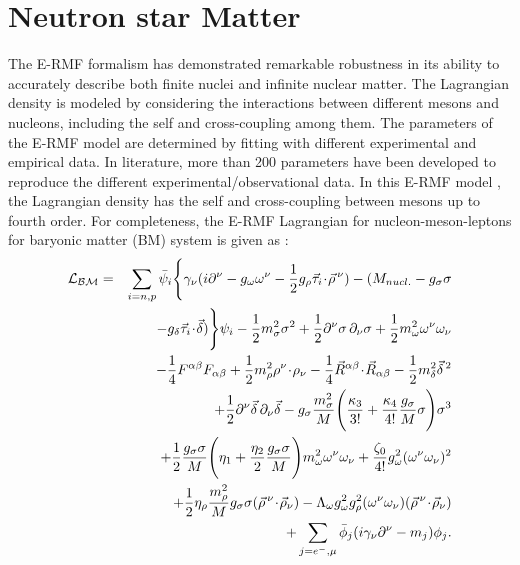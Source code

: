 \section{Neutron star Matter}
\label{sec:2.1}
The E-RMF formalism has demonstrated remarkable robustness in its ability to accurately describe both finite nuclei and infinite nuclear matter. The Lagrangian density is modeled by considering the interactions between different mesons and nucleons, including the self and cross-coupling among them. The parameters of the E-RMF model are determined by fitting with different experimental and empirical data. In literature, more than 200 parameters have been developed to reproduce the different experimental/observational data\cite{PhysRevC.55.540,PhysRevC.63.044303,PhysRevC.74.045806,PhysRevC.70.058801,LALAZISSIS200936,PhysRevC.82.055803,PhysRevC.82.025203,PhysRevC.84.054309,PhysRevC.85.024302,PhysRevC.97.045806,PhysRevC.102.065805}. In this E-RMF model \cite{E-RMF1, E-RMF2, E-RMF3, E-RMF4, E-RMF5}, the Lagrangian density has the self and cross-coupling between mesons up to fourth order. For completeness, the E-RMF Lagrangian for nucleon-meson-leptons for baryonic matter (BM) system is given as \citep{Reinhard_1989, KUMAR2017197, PhysRevC.97.045806}: 
\begin{eqnarray}
	\label{Lagrangian}
	{\cal L_{BM}} & = &  \sum_{i=n,p} \bar\psi_{i}
	\Bigg\{\gamma_{\nu}(i\partial^{\nu}-g_{\omega}\omega^{\nu}-\frac{1}{2}g_{\rho}\vec{\tau}_{i}\!\cdot\!\vec{\rho}^{\,\nu})
	-(M_{nucl.}-g_{\sigma}\sigma
	\nonumber\\
	&&
	-g_{\delta}\vec{\tau}_{i}\!\cdot\!\vec{\delta})\Bigg\} \psi_{i}
	-\frac{1}{2}m_{\sigma}^{2}\sigma^2
	+\frac{1}{2}\partial^{\nu}\sigma\,\partial_{\nu}\sigma
	+\frac{1}{2}m_{\omega}^{2}\omega^{\nu}\omega_{\nu}
	\nonumber \\
	&& 
	-\frac{1}{4}F^{\alpha\beta}F_{\alpha\beta}
	+\frac{1}{2}m_{\rho}^{2}\rho^{\nu}\!\cdot\!\rho_{\nu} 
	-\frac{1}{4}\vec R^{\alpha\beta}\!\cdot\!\vec R_{\alpha\beta}
	-\frac{1}{2}m_{\delta}^{2}\vec\delta^{\,2}
	\nonumber \\
	&&
	+\frac{1}{2}\partial^{\nu}\vec\delta\,\partial_{\nu}\vec\delta
	-g_{\sigma}\frac{m_{\sigma}^2}{M}\Bigg(\frac{\kappa_3}{3!}+\frac{\kappa_4}{4!}\frac{g_{\sigma}}{M}\sigma\Bigg)\sigma^3
	\nonumber\\
	&&
	+\frac{1}{2}\frac{g_{\sigma}\sigma}{M}\Bigg(\eta_1+\frac{\eta_2}{2} \frac{g_{\sigma}\sigma}{M}\Bigg)m_\omega^2\omega^{\nu}\omega_{\nu}
	+\frac{\zeta_0}{4!}g_\omega^2(\omega^{\nu}\omega_{\nu})^2 
	\nonumber\\
	&&
	+\frac{1}{2}\eta_{\rho}\frac{m_{\rho}^2}{M}g_{\sigma}\sigma(\vec\rho^{\,\nu}\!\cdot\!\vec\rho_{\nu})
	-\Lambda_{\omega}g_{\omega}^2g_{\rho}^2(\omega^{\nu}\omega_{\nu})(\vec\rho^{\,\nu}\!\cdot\!\vec\rho_{\nu})
	\nonumber\\
	&&
	+\sum_{j=e^{-},\mu} \bar\phi_{j}(i\gamma_{\nu}\partial^{\nu}-m_{j})\phi_{j}.
	\label{eq1}
\end{eqnarray}
